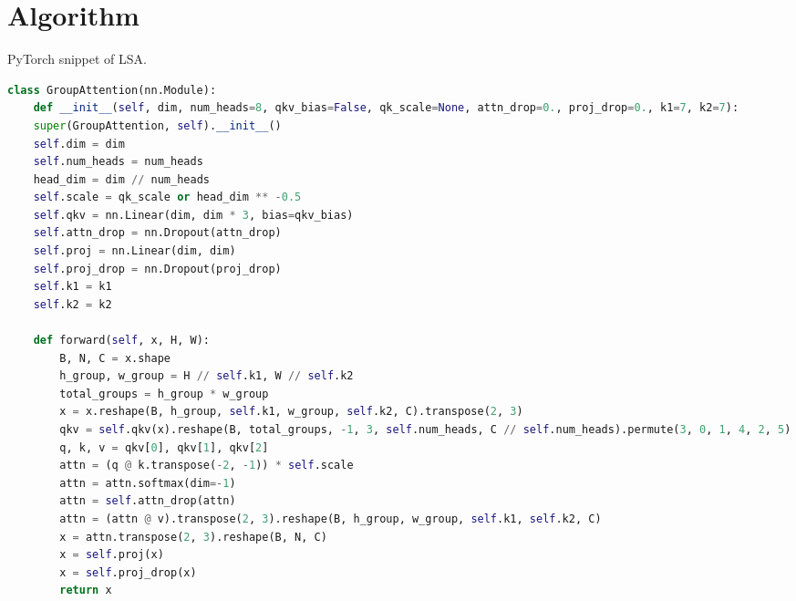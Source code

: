 \documentclass{article}
\begin{document}
\section{Algorithm}
\begin{algorithm}[h]
	\caption{PyTorch snippet of LSA.}
	\label{alg:local_group_attention}
	\begin{lstlisting}[language=python]
class GroupAttention(nn.Module):
    def __init__(self, dim, num_heads=8, qkv_bias=False, qk_scale=None, attn_drop=0., proj_drop=0., k1=7, k2=7):
	super(GroupAttention, self).__init__()
	self.dim = dim
	self.num_heads = num_heads
	head_dim = dim // num_heads
	self.scale = qk_scale or head_dim ** -0.5
	self.qkv = nn.Linear(dim, dim * 3, bias=qkv_bias)
	self.attn_drop = nn.Dropout(attn_drop)
	self.proj = nn.Linear(dim, dim)
	self.proj_drop = nn.Dropout(proj_drop)
	self.k1 = k1
	self.k2 = k2
    
    def forward(self, x, H, W):
        B, N, C = x.shape
        h_group, w_group = H // self.k1, W // self.k2
        total_groups = h_group * w_group
        x = x.reshape(B, h_group, self.k1, w_group, self.k2, C).transpose(2, 3)
        qkv = self.qkv(x).reshape(B, total_groups, -1, 3, self.num_heads, C // self.num_heads).permute(3, 0, 1, 4, 2, 5)
        q, k, v = qkv[0], qkv[1], qkv[2]   
        attn = (q @ k.transpose(-2, -1)) * self.scale
        attn = attn.softmax(dim=-1)
        attn = self.attn_drop(attn)
        attn = (attn @ v).transpose(2, 3).reshape(B, h_group, w_group, self.k1, self.k2, C)
        x = attn.transpose(2, 3).reshape(B, N, C)
        x = self.proj(x)
        x = self.proj_drop(x)
        return x
	\end{lstlisting}
\end{algorithm}
\end{document}
